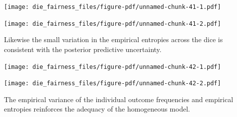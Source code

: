 \documentclass[
  letterpaper,
  DIV=11,
  numbers=noendperiod]{scrartcl}
\newenvironment{Shaded}{\begin{snugshade}}{\end{snugshade}}
\newcommand{\AttributeTok}[1]{\textcolor[rgb]{0.40,0.45,0.13}{#1}}
\newcommand{\ControlFlowTok}[1]{\textcolor[rgb]{0.00,0.23,0.31}{#1}}
\newcommand{\DecValTok}[1]{\textcolor[rgb]{0.68,0.00,0.00}{#1}}
\newcommand{\FloatTok}[1]{\textcolor[rgb]{0.68,0.00,0.00}{#1}}
\newcommand{\FunctionTok}[1]{\textcolor[rgb]{0.28,0.35,0.67}{#1}}
\newcommand{\NormalTok}[1]{\textcolor[rgb]{0.00,0.23,0.31}{#1}}
\newcommand{\OtherTok}[1]{\textcolor[rgb]{0.00,0.23,0.31}{#1}}
\newcommand{\SpecialCharTok}[1]{\textcolor[rgb]{0.37,0.37,0.37}{#1}}
\newcommand{\StringTok}[1]{\textcolor[rgb]{0.13,0.47,0.30}{#1}}
\begin{document}
\texttt{[image: die\_fairness\_files/figure-pdf/unnamed-chunk-41-1.pdf]}

\texttt{[image: die\_fairness\_files/figure-pdf/unnamed-chunk-41-2.pdf]}

Likewise the small variation in the empirical entropies across the dice
is consistent with the posterior predictive uncertainty.

\begin{Shaded}
\end{Shaded}

\texttt{[image: die\_fairness\_files/figure-pdf/unnamed-chunk-42-1.pdf]}

\texttt{[image: die\_fairness\_files/figure-pdf/unnamed-chunk-42-2.pdf]}

The empirical variance of the individual outcome frequencies and
empirical entropies reinforces the adequacy of the homogeneous model.
\end{document}
